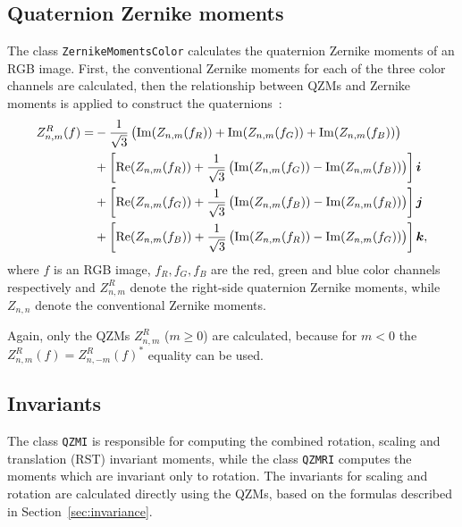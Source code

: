 \subsection{Quaternion Zernike moments}
The class \texttt{ZernikeMomentsColor} calculates the quaternion Zernike moments of an RGB image. First, the conventional Zernike moments for each of the three color channels are calculated, then the relationship between QZMs and Zernike moments is applied to construct the quaternions~\cite{qzmi}:
\begin{gather}
    \begin{split}
        Z_{n,m}^R(f) = &-\frac{1}{\sqrt{3}}\left( \operatorname{Im}(Z_{n,m}(f_R)) + \operatorname{Im}(Z_{n,m}(f_G)) + \operatorname{Im}(Z_{n,m}(f_B)) \right)\\
        &+\left[\operatorname{Re}(Z_{n,m}(f_R)) + \frac{1}{\sqrt{3}}\left(\operatorname{Im}(Z_{n,m}(f_G)) - \operatorname{Im}(Z_{n,m}(f_B))\right)\right]\bm{i}\\
        &+\left[\operatorname{Re}(Z_{n,m}(f_G)) + \frac{1}{\sqrt{3}}\left(\operatorname{Im}(Z_{n,m}(f_B)) - \operatorname{Im}(Z_{n,m}(f_R))\right)\right]\bm{j}\\
        &+\left[\operatorname{Re}(Z_{n,m}(f_B)) + \frac{1}{\sqrt{3}}\left(\operatorname{Im}(Z_{n,m}(f_R)) - \operatorname{Im}(Z_{n,m}(f_G))\right)\right]\bm{k},\\
    \end{split} \label{eq:QZM_ZM}
\end{gather}
where $f$ is an RGB image, $f_R, f_G, f_B$ are the red, green and blue color channels respectively and $Z_{n,m}^R$ denote the right-side quaternion Zernike moments, while $Z_{n,n}$ denote the conventional Zernike moments. 

Again, only the QZMs $Z_{n,m}^R$ ($m \geq 0$) are calculated, because for $m < 0$ the $Z_{n,m}^R(f) = Z_{n,-m}^R(f)^{*}$ equality can be used.

\subsection{Invariants}
The class \texttt{QZMI} is responsible for computing the combined rotation, scaling and translation (RST) invariant moments, while the class \texttt{QZMRI} computes the moments which are invariant only to rotation.
The invariants for scaling and rotation are calculated directly using the QZMs, based on the formulas described in Section~\ref{sec:invariance}.

